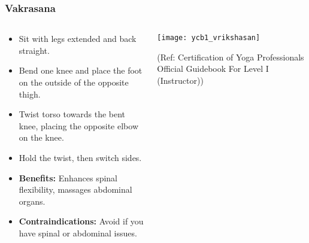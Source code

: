 \begin{frame}[fragile]\frametitle{Vakrasana}
\begin{columns}
    \begin{column}[T]{0.5\linewidth}
      \begin{itemize}
        \item Sit with legs extended and back straight.
        \item Bend one knee and place the foot on the outside of the opposite thigh.
        \item Twist torso towards the bent knee, placing the opposite elbow on the knee.
        \item Hold the twist, then switch sides.
        \item \textbf{Benefits:} Enhances spinal flexibility, massages abdominal organs.
        \item \textbf{Contraindications:} Avoid if you have spinal or abdominal issues.
      \end{itemize}
    \end{column}
    \begin{column}[T]{0.5\linewidth}
        \begin{center}
        \begin{center}
		        \texttt{[image: ycb1\_vrikshasan]}
				
				{\tiny (Ref: Certification  of Yoga Professionals Official Guidebook For Level I (Instructor))}	        
		\end{center}   
        \end{center}    
    \end{column}
  \end{columns}
\end{frame}

